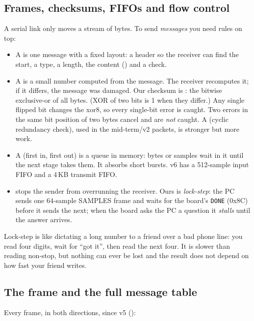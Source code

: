 \documentclass[11pt]{article}
\begin{document}
\subsection{Frames, checksums, FIFOs and flow control}

A serial link only moves a stream of bytes. To send \emph{messages} you need rules on top:

\begin{itemize}
  \item A  is one message with a fixed layout: a header so the receiver can find the start, a type, a length, the content () and a check.
  \item A  is a small number computed from the message. The receiver recomputes it; if it differs, the message was damaged. Our checksum is : the bitwise exclusive-or of all bytes. (XOR of two bits is 1 when they differ.) Any single flipped bit changes the xor8, so every single-bit error is caught. Two errors in the same bit position of two bytes cancel and are \emph{not} caught. A  (cyclic redundancy check), used in the mid-term/v2 packets, is stronger but more work.
  \item A  (first in, first out) is a queue in memory: bytes or samples wait in it until the next stage takes them. It absorbs short bursts. v6 has a 512-sample input FIFO and a 4\,KB transmit FIFO.
  \item {} stops the sender from overrunning the receiver. Ours is \emph{lock-step}: the PC sends one 64-sample SAMPLES frame and waits for the board's \texttt{DONE} (0x8C) before it sends the next; when the board asks the PC a question it \emph{stalls} until the answer arrives.
\end{itemize}

\begin{analogy}
Lock-step is like dictating a long number to a friend over a bad phone line: you read four digits, wait for ``got it'', then read the next four. It is slower than reading non-stop, but nothing can ever be lost and the result does not depend on how fast your friend writes.
\end{analogy}

\subsection{The frame and the full message table}
\label{sec:msgtable}

Every frame, in both directions, since v5 ():
\end{document}

